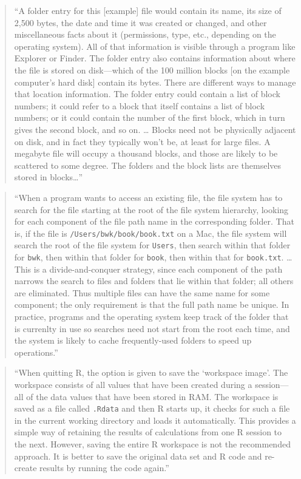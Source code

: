 \documentclass[]{tufte-book}
\begin{document}
\begin{quote}
``A folder entry for this {[}example{]} file would contain its name, its size of 2,500 bytes,
the date and time it was created or changed, and other miscellaneous facts about it
(permissions, type, etc., depending on the operating system). All of that information
is visible through a program like Explorer or Finder. The folder entry also contains
information about where the file is stored on disk---which of the 100 million blocks
{[}on the example computer's hard disk{]} contain its bytes. There are different ways to
manage that location information. The folder entry could contain a list of block numbers;
it could refer to a block that itself contains a list of block numbers; or it could
contain the number of the first block, which in turn gives the second block, and so
on. \ldots{} Blocks need not be physically adjacent on disk, and in fact they typically
won't be, at least for large files. A megabyte file will occupy a thousand blocks, and
those are likely to be scattered to some degree. The folders and the block lists are
themselves stored in blocks\ldots{}'' \citep{kernighan2011d}
\end{quote}

\begin{quote}
``When a program wants to access an existing file, the file system has to search for
the file starting at the root of the file system hierarchy, looking for each component
of the file path name in the corresponding folder. That is, if the file is
\texttt{/Users/bwk/book/book.txt} on a Mac, the file system will search the root of the file
system for \texttt{Users}, then search within that folder for \texttt{bwk}, then within that folder
for \texttt{book}, then within that for \texttt{book.txt}. \ldots{} This is a divide-and-conquer strategy,
since each component of the path narrows the search to files and folders that lie within
that folder; all others are eliminated. Thus multiple files can have the same name for
some component; the only requirement is that the full path name be unique. In practice,
programs and the operating system keep track of the folder that is currenlty in use
so searches need not start from the root each time, and the system is likely to
cache frequently-used folders to speed up operations.'' \citep{kernighan2011d}
\end{quote}

\begin{quote}
``When quitting R, the option is given to save the `workspace image'. The workspace
consists of all values that have been created during a session---all of the data values
that have been stored in RAM. The workspace is saved as a file called \texttt{.Rdata} and then
R starts up, it checks for such a file in the current working directory and loads it
automatically. This provides a simple way of retaining the results of calculations from
one R session to the next. However, saving the entire R workspace is not the recommended
approach. It is better to save the original data set and R code and re-create results by
running the code again.'' \citep{murrell2009introduction}
\end{quote}
\end{document}
